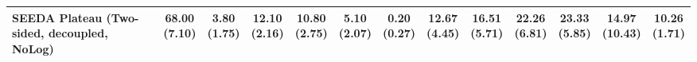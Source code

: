 \begin{table}[H]
{\begin{tabular}{l|cccccc|cccccc}
SEEDA Plateau (Two-sided, decoupled, NoLog) & \bfseries \makecell{68.00 \\ (7.10)} & \makecell{3.80 \\ (1.75)} & {\cellcolor[HTML]{C8E6C9}} \makecell{12.10 \\ (2.16)} & \makecell{10.80 \\ (2.75)} & \makecell{5.10 \\ (2.07)} & \makecell{0.20 \\ (0.27)} & \makecell{12.67 \\ (4.45)} & \makecell{16.51 \\ (5.71)} & {\cellcolor[HTML]{C8E6C9}} \makecell{22.26 \\ (6.81)} & \bfseries \makecell{23.33 \\ (5.85)} & \makecell{14.97 \\ (10.43)} & \makecell{10.26 \\ (1.71)} \\
\bottomrule
\end{tabular}
}%
\end{table}
